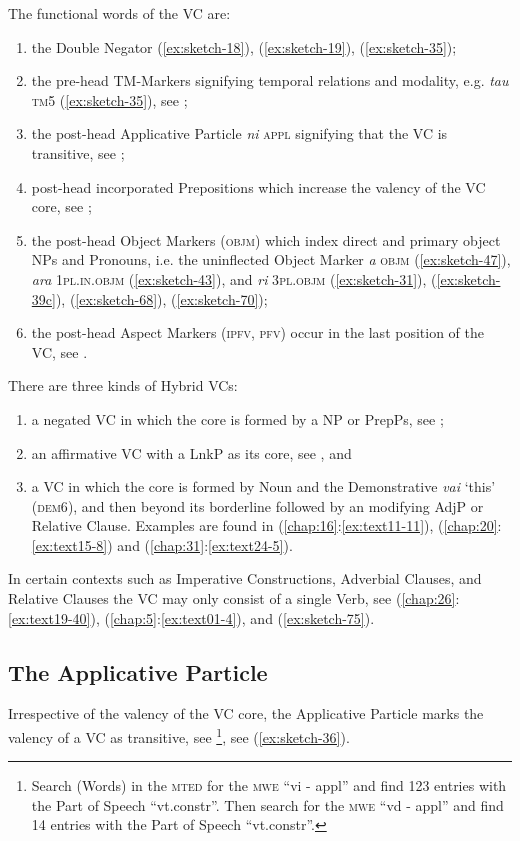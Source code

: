 \documentclass[output=paper]{langscibook}
\begin{document}
The functional words of the VC are:
\begin{enumerate}
    \item the Double Negator (\ref{ex:sketch-18}), (\ref{ex:sketch-19}), (\ref{ex:sketch-35});
    \item the pre-head TM-Markers signifying temporal relations and modality, e.g. \textit{tau} \textsc{tm}5 (\ref{ex:sketch-35}), see ;
    \item the post-head Applicative Particle \textit{ni} \textsc{appl} signifying that the VC is transitive, see ; 
    \item post-head incorporated Prepositions which increase the valency of the VC core, see ;
    \item the post-head Object Markers (\textsc{objm}) which index direct and primary object NPs and Pronouns, i.e. the  uninflected Object Marker \textit{a} \textsc{objm} (\ref{ex:sketch-47}), \textit{ara} 1\textsc{pl}.\textsc{in}.\textsc{objm} (\ref{ex:sketch-43}), and \textit{ri} 3\textsc{pl}.\textsc{objm} (\ref{ex:sketch-31}), (\ref{ex:sketch-39c}), (\ref{ex:sketch-68}), (\ref{ex:sketch-70});
    \item the post-head Aspect Markers (\textsc{ipfv}, \textsc{pfv}) occur in the last position of the VC, see .
\end{enumerate}
There are three kinds of Hybrid VCs:
\begin{enumerate}
    \item a negated VC in which the core is formed by a NP or PrepPs, see ;
    \item an affirmative VC with a LnkP as its core, see , and 
    \item a VC in which the core is formed by Noun and the Demonstrative \textit{vai} `this' (\textsc{dem6}), and then beyond its borderline followed by an modifying AdjP or Relative Clause. Examples are found in (\ref{chap:16}:\ref{ex:text11-11}), (\ref{chap:20}:\ref{ex:text15-8}) and (\ref{chap:31}:\ref{ex:text24-5}).
\end{enumerate}
In certain contexts such as Imperative Constructions, Adverbial Clauses, and Relative Clauses the VC may only consist of a single Verb, see (\ref{chap:26}:\ref{ex:text19-40}), (\ref{chap:5}:\ref{ex:text01-4}), and (\ref{ex:sketch-75}).

\subsection{The Applicative Particle}\label{sec:applart}
Irrespective of the valency of the VC core, the Applicative Particle marks the valency of a VC as transitive, see \textcite[493--496]{Mosel:2010bh}\footnote{Search (Words) in the \textsc{mted} for the \textsc{mwe}  ``vi - appl''  and find 123 entries with the Part of Speech ``vt.constr''. Then search for the \textsc{mwe} ``vd - appl'' and find 14 entries with the Part of Speech ``vt.constr''.}, see (\ref{ex:sketch-36}).
\end{document}
